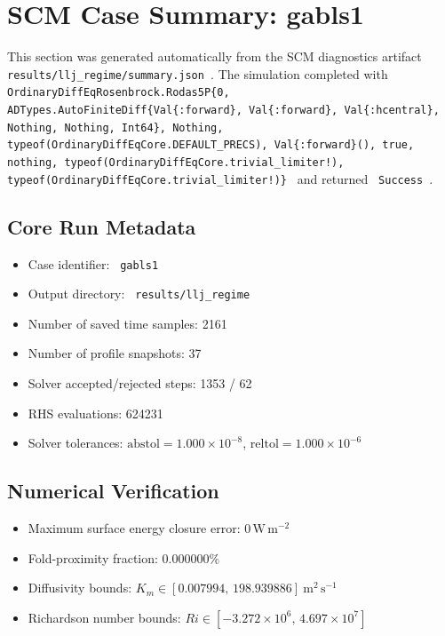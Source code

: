 \section{SCM Case Summary: gabls1}
\label{sec:scm_case_gabls1}

This section was generated automatically from the SCM diagnostics artifact
\texttt{ results/llj\_regime/summary.json }. The simulation completed with \texttt{ OrdinaryDiffEqRosenbrock.Rodas5P\{0, ADTypes.AutoFiniteDiff\{Val\{:forward\}, Val\{:forward\}, Val\{:hcentral\}, Nothing, Nothing, Int64\}, Nothing, typeof(OrdinaryDiffEqCore.DEFAULT\_PRECS), Val\{:forward\}(), true, nothing, typeof(OrdinaryDiffEqCore.trivial\_limiter!), typeof(OrdinaryDiffEqCore.trivial\_limiter!)\} }
and returned \texttt{ Success }.

\subsection{Core Run Metadata}
\begin{itemize}
  \item Case identifier: \texttt{ gabls1 }
  \item Output directory: \texttt{ results/llj\_regime }
  \item Number of saved time samples: 2161
  \item Number of profile snapshots: 37
  \item Solver accepted/rejected steps: 1353 / 62
  \item RHS evaluations: 624231
  \item Solver tolerances: $\mathrm{abstol}=1.000 \times 10^{-8}$, $\mathrm{reltol}=1.000 \times 10^{-6}$
\end{itemize}

\subsection{Numerical Verification}
\begin{itemize}
  \item Maximum surface energy closure error:
  $0\,\mathrm{W\,m^{-2}}$
  \item Fold-proximity fraction:
  $0.000000\%$
  \item Diffusivity bounds:
  $K_m \in [0.007994,\,198.939886]~\mathrm{m^2\,s^{-1}}$
  \item Richardson number bounds:
  $Ri \in [-3.272 \times 10^{6},\,4.697 \times 10^{7}]$
\end{itemize}

